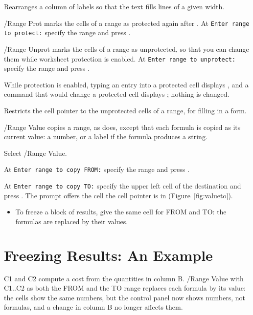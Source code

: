 Rearranges a column of labels so that the text fills lines of a given
width.

/Range Prot marks the cells of a range as protected again after
.  At \texttt{Enter range to protect:} specify the
range and press .

/Range Unprot marks the cells of a range as unprotected, so that you can
change them while worksheet protection is enabled.  At
\texttt{Enter range to unprotect:} specify the range and press
.

\begin{Note}
While protection is enabled, typing an entry into a protected cell displays
, and a command that would change a protected cell
displays ; nothing is changed.
\end{Note}

Restricts the cell pointer to the unprotected cells of a range, for filling
in a form.

/Range Value copies a range, as  does, except that each
formula is copied as its current value: a number, or a label if the formula
produces a string.
\begin{Steps123}
\item Select /Range Value.
\item At \texttt{Enter range to copy FROM:} specify the range and press
  .
\item At \texttt{Enter range to copy TO:} specify the upper left cell of the
  destination and press .  The prompt offers the cell the
  cell pointer is in (Figure~\ref{fig:valueto}).
\end{Steps123}
\begin{itemize}
\item To freeze a block of results, give the same cell for FROM and TO: the
  formulas are replaced by their values.
\end{itemize}

\section{Freezing Results: An Example}
C1 and C2 compute a cost from the quantities in column B.  /Range Value
with C1..C2 as both the FROM and the TO range replaces each formula by its
value: the cells show the same numbers, but the control panel now shows
numbers, not formulas, and a change in column B no longer affects them.

